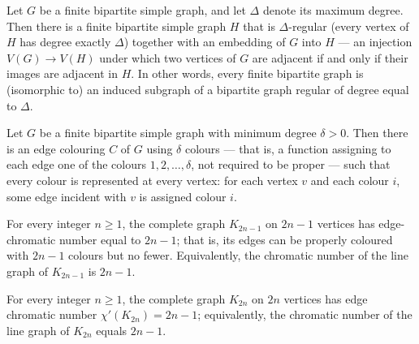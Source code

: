 \begin{theorem}
\label{SimpleGraph.exists_regular_bipartite_supergraph}
Let $G$ be a finite bipartite simple graph, and let $\Delta$ denote its maximum degree.
Then there is a finite bipartite simple graph $H$ that is $\Delta$-regular (every vertex
of $H$ has degree exactly $\Delta$) together with an embedding of $G$ into $H$ — an
injection $V(G) \to V(H)$ under which two vertices of $G$ are adjacent if and only if
their images are adjacent in $H$. In other words, every finite bipartite graph is
(isomorphic to) an induced subgraph of a bipartite graph regular of degree equal to
$\Delta$.
\end{theorem}

\begin{theorem}
\label{SimpleGraph.exists_edge_colouring_all_represented_of_isBipartite}
Let $G$ be a finite bipartite simple graph with minimum degree $\delta > 0$. Then there
is an edge colouring $C$ of $G$ using $\delta$ colours — that is, a function assigning
to each edge one of the colours $1, 2, \ldots, \delta$, not required to be proper — such
that every colour is represented at every vertex: for each vertex $v$ and each colour
$i$, some edge incident with $v$ is assigned colour $i$.
\end{theorem}

\begin{theorem}
\label{SimpleGraph.edgeChromaticNumber_completeGraph_odd}
For every integer $n \ge 1$, the complete graph $K_{2n-1}$ on $2n-1$ vertices has
edge-chromatic number equal to $2n-1$; that is, its edges can be properly coloured with
$2n-1$ colours but no fewer. Equivalently, the chromatic number of the line graph of
$K_{2n-1}$ is $2n-1$.
\end{theorem}

\begin{theorem}
\label{SimpleGraph.edgeChromaticNumber_completeGraph_even}
For every integer $n \ge 1$, the complete graph $K_{2n}$ on $2n$ vertices has edge
chromatic number $\chi'(K_{2n}) = 2n - 1$; equivalently, the chromatic number of the
line graph of $K_{2n}$ equals $2n - 1$.
\end{theorem}

